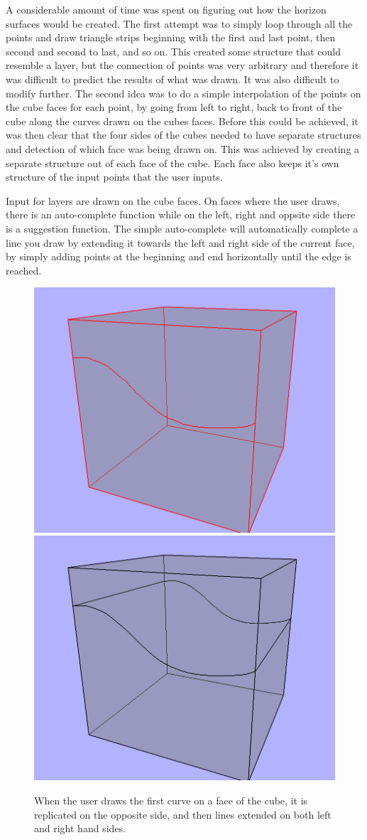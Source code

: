 \documentclass[a4paper,12pt]{report}
\begin{document}
A considerable amount of time was spent on figuring out how the horizon surfaces would be created. The first attempt was to simply loop through all the points and draw triangle strips beginning with the first and last point, then second and second to last, and so on. This created some structure that could resemble a layer, but the connection of points was very arbitrary and therefore it was difficult to predict the results of what was drawn. It was also difficult to modify further. The second idea was to do a simple interpolation of the points on the cube faces for each point, by going from left to right, back to front of the cube along the curves drawn on the cubes faces. Before this could be achieved, it was then clear that the four sides of the cubes needed to have separate structures and detection of which face was being drawn on. This was achieved by creating a separate structure out of each 
face of the cube. Each face also keeps it's own structure of the input points that the user inputs.


Input for layers are drawn on the cube faces. On faces where the user draws, there is an auto-complete function while on the left, right and oppsite side there is a suggestion function. The simple auto-complete will automatically complete a line you draw by extending it towards the left and right side of the current face, by simply adding points at the beginning and end horizontally until the edge is reached.

\begin{figure}
\includegraphics[width=.5\linewidth]{thesis/suggestion1.png}
\includegraphics[width=.5\linewidth]{thesis/suggestion2.png}
 \caption{When the user draws the first curve on a face of the cube, it is replicated on the opposite side, and then lines extended on both left and right hand sides.}
 \label{fig:suggest}
\end{figure}
\end{document}
